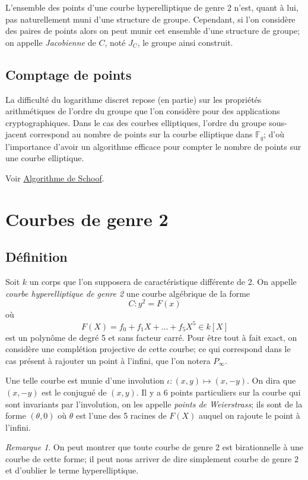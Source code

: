 \documentclass[a4paper]{article}
\theoremstyle{definition}
\theoremstyle{remark}
\newtheorem{remarque}{Remarque}
\numberwithin{equation}{section}
\begin{document}
L'ensemble des points d'une courbe hyperelliptique de genre 2 n'est, quant à lui, pas naturellement muni d'une structure de groupe. Cependant, si l'on considère des paires de points alors on peut munir cet ensemble d'une structure de groupe; on appelle \emph{Jacobienne} de $C$, noté $J_C$, le groupe ainsi construit.

\subsection{Comptage de points}
La difficulté du logarithme discret repose (en partie) sur les propriétés arithmétiques de l'ordre du groupe que l'on considère pour des applications cryptographiques. Dans le cas des courbes elliptiques, l'ordre du groupe sous-jacent correspond au nombre de points sur la courbe elliptique dans $\mathbb{F}_q$; d'où l'importance d'avoir un algorithme efficace pour compter le nombre de points sur une courbe elliptique.

Voir \hyperref[algoSchoof]{Algorithme de Schoof}.

\section{Courbes de genre 2}

\subsection{Définition}
Soit $k$ un corps que l'on supposera de caractéristique différente de 2.
On appelle \emph{courbe hyperelliptique de genre 2} une courbe algébrique de la forme
$$C : y^2 = F(x)$$
où $$F(X) = f_0 + f_1X + ... + f_5X^5 \in k[X]$$
est un polynôme de degré 5 et sans facteur carré. Pour être tout à fait exact, on considère une complétion projective de cette courbe; ce qui correspond dans le cas présent à rajouter un point à l'infini, que l'on notera $P_\infty$.

Une telle courbe est munie d'une involution $\iota : (x,y) \longmapsto (x,-y)$. On dira que $(x,-y)$ est le conjugué de $(x,y)$. Il y a 6 points particuliers sur la courbe qui sont invariants par l'involution, on les appelle \emph{points de Weierstrass}; ils sont de la forme $(\theta,0)$ où $\theta$ est l'une des 5 racines de $F(X)$ auquel on rajoute le point à l'infini.

\begin{remarque}
On peut montrer que toute courbe de genre 2 est birationnelle à une courbe de cette forme; il peut nous arriver de dire simplement courbe de genre 2 et d'oublier le terme hyperelliptique.
\end{remarque}
\end{document}
